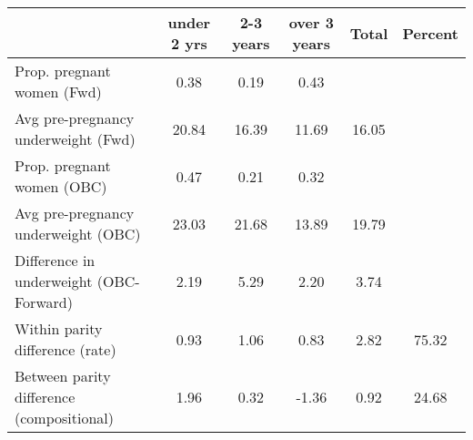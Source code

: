 \begin{tabular}{l*{5}{c}}
\toprule
            &\multicolumn{1}{c}{under 2 yrs}&\multicolumn{1}{c}{2-3 years}&\multicolumn{1}{c}{over 3 years}&\multicolumn{1}{c}{Total}&\multicolumn{1}{c}{Percent}\\
\midrule
\midrule
Prop. pregnant women (Fwd)&        0.38&        0.19&        0.43&            &            \\
Avg pre-pregnancy underweight (Fwd)&       20.84&       16.39&       11.69&       16.05&            \\
Prop. pregnant women (OBC)&        0.47&        0.21&        0.32&            &            \\
Avg pre-pregnancy underweight (OBC)&       23.03&       21.68&       13.89&       19.79&            \\
Difference in underweight (OBC-Forward)&        2.19&        5.29&        2.20&        3.74&            \\
Within parity difference (rate)&        0.93&        1.06&        0.83&        2.82&       75.32\\
Between parity difference (compositional)&        1.96&        0.32&       -1.36&        0.92&       24.68\\
\bottomrule
\end{tabular}
